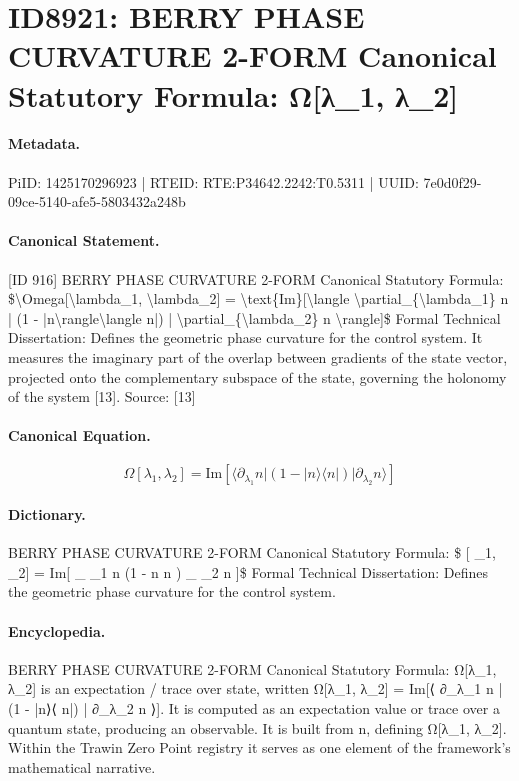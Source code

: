 \section*{ID8921: BERRY PHASE CURVATURE 2-FORM Canonical Statutory Formula: Ω[λ\_1, λ\_2]}
\paragraph{Metadata.}
PiID: 1425170296923 | RTEID: RTE:P34642.2242:T0.5311 | UUID: 7e0d0f29-09ce-5140-afe5-5803432a248b

\paragraph{Canonical Statement.}
[ID 916] BERRY PHASE CURVATURE 2-FORM Canonical Statutory Formula: \$\textbackslash{}Omega[\textbackslash{}lambda\_1, \textbackslash{}lambda\_2] = \textbackslash{}text\{Im\}[\textbackslash{}langle \textbackslash{}partial\_\{\textbackslash{}lambda\_1\} n | (1 - |n\textbackslash{}rangle\textbackslash{}langle n|) | \textbackslash{}partial\_\{\textbackslash{}lambda\_2\} n \textbackslash{}rangle]\$ Formal Technical Dissertation: Defines the geometric phase curvature for the control system. It measures the imaginary part of the overlap between gradients of the state vector, projected onto the complementary subspace of the state, governing the holonomy of the system [13]. Source: [13]

\paragraph{Canonical Equation.}
\[
\Omega[\lambda_1, \lambda_2] = \text{Im}[\langle \partial_{\lambda_1} n | (1 - |n\rangle\langle n|) | \partial_{\lambda_2} n \rangle]
\]

\paragraph{Dictionary.}
BERRY PHASE CURVATURE 2-FORM Canonical Statutory Formula: \$ [ \_1, \_2] = Im[ \_ \_1 n (1 - n n ) \_ \_2 n ]\$ Formal Technical Dissertation: Defines the geometric phase curvature for the control system.

\paragraph{Encyclopedia.}
BERRY PHASE CURVATURE 2-FORM Canonical Statutory Formula: Ω[λ\_1, λ\_2] is an expectation / trace over state, written Ω[λ\_1, λ\_2] = Im[⟨ ∂\_λ\_1 n | (1 - |n⟩⟨ n|) | ∂\_λ\_2 n ⟩]. It is computed as an expectation value or trace over a quantum state, producing an observable. It is built from n, defining Ω[λ\_1, λ\_2]. Within the Trawin Zero Point registry it serves as one element of the framework's mathematical narrative.
